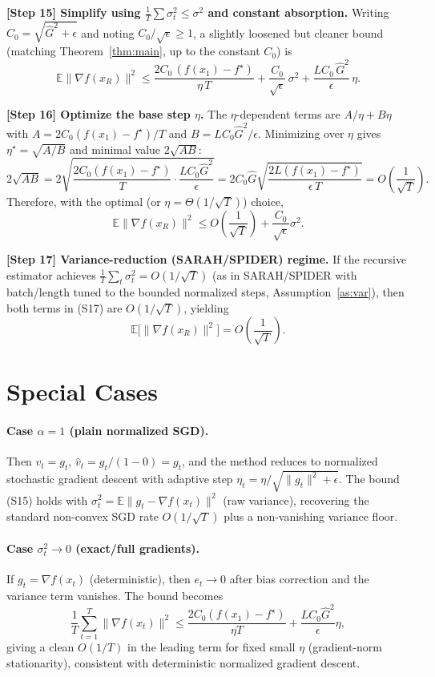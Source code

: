 \documentclass[11pt]{article}
\begin{document}
\noindent\textbf{[Step 15] Simplify using $\tfrac1T\sum\sigma_t^2 \le \sigma^2$ and constant absorption.}
Writing $C_0 = \sqrt{\hat G^2+\epsilon}$ and noting $C_0/\sqrt{\epsilon}\ge 1$, a slightly
loosened but cleaner bound (matching Theorem~\ref{thm:main}, up to the constant $C_0$) is
\[
\mathbb{E}\|\nabla f(x_R)\|^2
\le \frac{2 C_0\,(f(x_1)-f^\star)}{\eta\,T}
+ \frac{C_0}{\sqrt{\epsilon}}\,\sigma^2
+ \frac{L C_0\,\hat G^2}{\epsilon}\,\eta.
\tag{S15}
\]

\noindent\textbf{[Step 16] Optimize the base step $\eta$.}
The $\eta$-dependent terms are $A/\eta + B\eta$ with
$A = 2C_0(f(x_1)-f^\star)/T$ and $B = LC_0\hat G^2/\epsilon$.
Minimizing over $\eta$ gives $\eta^\star=\sqrt{A/B}$ and minimal value $2\sqrt{AB}$:
\[
2\sqrt{AB}
= 2\sqrt{\frac{2C_0(f(x_1)-f^\star)}{T}\cdot \frac{LC_0\hat G^2}{\epsilon}}
= 2C_0\hat G\sqrt{\frac{2L(f(x_1)-f^\star)}{\epsilon\,T}}
= O\!\left(\frac{1}{\sqrt T}\right).
\tag{S16}
\]
Therefore, with the optimal (or $\eta=\Theta(1/\sqrt T)$) choice,
\[
\mathbb{E}\|\nabla f(x_R)\|^2
\le O\!\left(\frac{1}{\sqrt T}\right) + \frac{C_0}{\sqrt\epsilon}\sigma^2 .
\tag{S17}
\]

\noindent\textbf{[Step 17] Variance-reduction (SARAH/SPIDER) regime.}
If the recursive estimator achieves $\tfrac1T\sum_t\sigma_t^2 = O(1/\sqrt T)$ (as in
SARAH/SPIDER with batch/length tuned to the bounded normalized steps,
Assumption~\ref{as:var}), then both terms in (S17) are $O(1/\sqrt T)$, yielding
\[
\boxed{\;\mathbb{E}\big[\|\nabla f(x_R)\|^2\big] = O\!\left(\frac{1}{\sqrt{T}}\right).\;}
\]

\section*{Special Cases}

\paragraph{Case $\alpha=1$ (plain normalized SGD).}
Then $v_t=g_t$, $\hat v_t = g_t/(1-0)=g_t$, and the method reduces to normalized stochastic
gradient descent with adaptive step $\eta_t=\eta/\sqrt{\|g_t\|^2+\epsilon}$. The bound (S15)
holds with $\sigma_t^2 = \mathbb{E}\|g_t-\nabla f(x_t)\|^2$ (raw variance), recovering the
standard non-convex SGD rate $O(1/\sqrt T)$ plus a non-vanishing variance floor.

\paragraph{Case $\sigma_t^2 \to 0$ (exact/full gradients).}
If $g_t=\nabla f(x_t)$ (deterministic), then $e_t \to 0$ after bias correction and the
variance term vanishes. The bound becomes
\[
\frac{1}{T}\sum_{t=1}^T \|\nabla f(x_t)\|^2
\le \frac{2C_0(f(x_1)-f^\star)}{\eta T} + \frac{L C_0 \hat G^2}{\epsilon}\eta,
\]
giving a clean $O(1/T)$ in the leading term for fixed small $\eta$ (gradient-norm
stationarity), consistent with deterministic normalized gradient descent.
\end{document}
